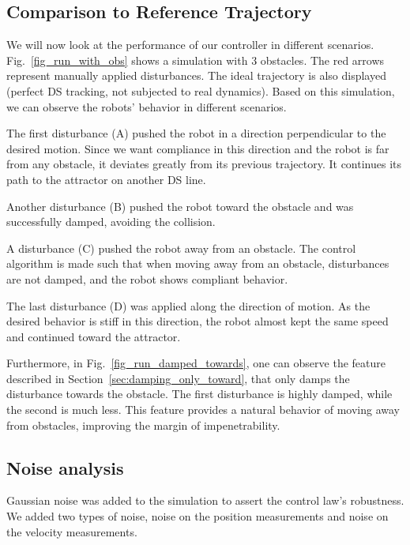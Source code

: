 \subsection{Comparison to Reference Trajectory}
We will now look at the performance of our controller in different scenarios. Fig.~\ref{fig_run_with_obs} shows a simulation with 3 obstacles. The red arrows represent manually applied disturbances. The ideal trajectory is also displayed (perfect DS tracking, not subjected to real dynamics). Based on this simulation, we can observe the robots' behavior in different scenarios.

The first disturbance (A) pushed the robot in a direction perpendicular to the desired motion. Since we want compliance in this direction and the robot is far from any obstacle, it deviates greatly from its previous trajectory. It continues its path to the attractor on another DS line.

Another disturbance (B) pushed the robot toward the obstacle and was successfully damped, avoiding the collision.

A disturbance (C) pushed the robot away from an obstacle. The control algorithm is made such that when moving away from an obstacle, disturbances are not damped, and the robot shows compliant behavior. 

The last disturbance (D) was applied along the direction of motion. As the desired behavior is stiff in this direction, the robot almost kept the same speed and continued toward the attractor.


Furthermore, in Fig.~\ref{fig_run_damped_towards}, one can observe the feature described in Section~\ref{sec:damping_only_toward}, that only damps the disturbance towards the obstacle.
The first disturbance is highly damped, while the second is much less. This feature provides a natural behavior of moving away from obstacles, improving the margin of impenetrability. 

\subsection{Noise analysis}
Gaussian noise was added to the simulation to assert the control law's robustness. We added two types of noise, noise on the position measurements and noise on the velocity measurements. 

